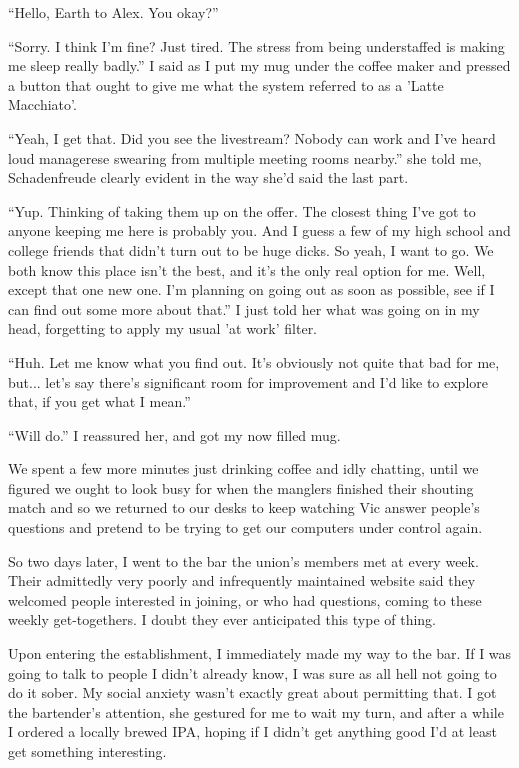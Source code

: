 \documentclass[a5paper]{report}%
\newcommand\spacer{{\center{$\cdots\\$}}}
\begin{document}
``Hello, Earth to Alex. You okay?''

``Sorry. I think I'm fine? Just tired. The stress from being understaffed is
making me sleep really badly.'' I said as I put my mug under the coffee maker
and pressed a button that ought to give me what the system referred to as a
'Latte Macchiato'.

``Yeah, I get that. Did you see the livestream? Nobody can work and I've heard
loud managerese swearing from multiple meeting rooms nearby.'' she told me,
Schadenfreude clearly evident in the way she'd said the last part.

``Yup. Thinking of taking them up on the offer. The closest thing I've got to
anyone keeping me here is probably you. And I guess a few of my high school and
college friends that didn't turn out to be huge dicks. So yeah, I want to go. We
both know this place isn't the best, and it's the only real option for me. Well,
except that one new one. I'm planning on going out as soon as possible, see if I
can find out some more about that.'' I just told her what was going on in my
head, forgetting to apply my usual 'at work' filter.

``Huh. Let me know what you find out. It's obviously not quite that bad for me,
but... let's say there's significant room for improvement and I'd like to
explore that, if you get what I mean.''

``Will do.'' I reassured her, and got my now filled mug.

We spent a few more minutes just drinking coffee and idly chatting, until we
figured we ought to look busy for when the manglers finished their shouting
match and so we returned to our desks to keep watching Vic answer people's
questions and pretend to be trying to get our computers under control again.

\spacer

So two days later, I went to the bar the union's members met at every week.
Their admittedly very poorly and infrequently maintained website said they
welcomed people interested in joining, or who had questions, coming to these
weekly get-togethers. I doubt they ever anticipated this type of thing.

Upon entering the establishment, I immediately made my way to the bar. If I was
going to talk to people I didn't already know, I was sure as all hell not going
to do it sober. My social anxiety wasn't exactly great about permitting that. I
got the bartender's attention, she gestured for me to wait my turn, and after a
while I ordered a locally brewed IPA, hoping if I didn't get anything good I'd
at least get something interesting.
\end{document}
